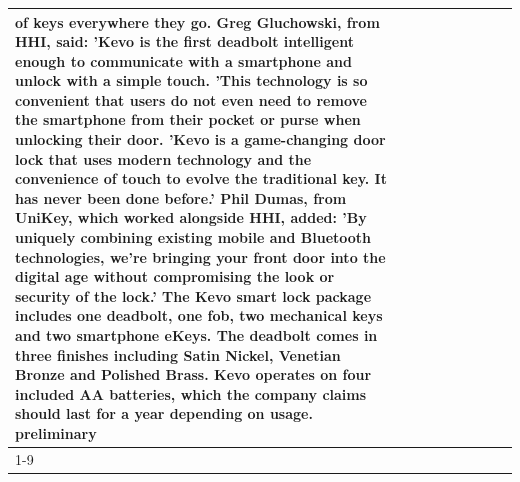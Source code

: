 \begin{table}[H]
\begin{tabular}{lllrlllll}
of keys everywhere they go. Greg Gluchowski, from HHI, said: 'Kevo is the first deadbolt intelligent enough to communicate with a smartphone and unlock with a simple touch. 'This technology is so convenient that users do not even need to remove the smartphone from their pocket or purse when unlocking their door. 'Kevo is a game-changing door lock that uses modern technology and the convenience of touch to evolve the traditional key. It has never been done before.' Phil Dumas, from UniKey, which worked alongside HHI, added: 'By uniquely combining existing mobile and Bluetooth technologies, we’re bringing your front door into the digital age without compromising the look or security of the lock.' The Kevo smart lock package includes one deadbolt, one fob, two mechanical keys and two smartphone eKeys. The deadbolt comes in three finishes including Satin Nickel, Venetian Bronze and Polished Brass. Kevo operates on four included AA batteries, which the company claims should last for a year depending on usage. preliminary \\
\cline{1-9}

\end{tabular}
\end{table}
